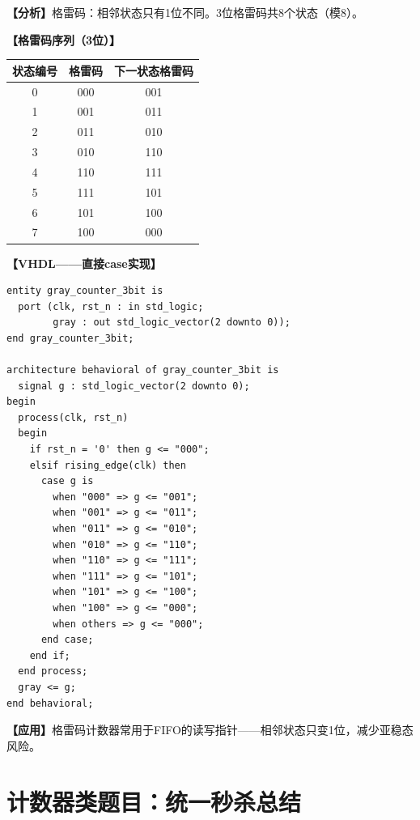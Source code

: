 \begin{solution}[完整解答]

\textbf{【分析】}格雷码：相邻状态只有1位不同。3位格雷码共8个状态（模8）。

\textbf{【格雷码序列（3位）】}
\begin{center}
\begin{tabular}{|c|c|c|}
\hline 状态编号 & 格雷码 & 下一状态格雷码 \\ \hline
0 & 000 & 001 \\ \hline 1 & 001 & 011 \\ \hline
2 & 011 & 010 \\ \hline 3 & 010 & 110 \\ \hline
4 & 110 & 111 \\ \hline 5 & 111 & 101 \\ \hline
6 & 101 & 100 \\ \hline 7 & 100 & 000 \\ \hline
\end{tabular}
\end{center}

\textbf{【VHDL——直接case实现】}
\begin{lstlisting}
entity gray_counter_3bit is
  port (clk, rst_n : in std_logic;
        gray : out std_logic_vector(2 downto 0));
end gray_counter_3bit;

architecture behavioral of gray_counter_3bit is
  signal g : std_logic_vector(2 downto 0);
begin
  process(clk, rst_n)
  begin
    if rst_n = '0' then g <= "000";
    elsif rising_edge(clk) then
      case g is
        when "000" => g <= "001";
        when "001" => g <= "011";
        when "011" => g <= "010";
        when "010" => g <= "110";
        when "110" => g <= "111";
        when "111" => g <= "101";
        when "101" => g <= "100";
        when "100" => g <= "000";
        when others => g <= "000";
      end case;
    end if;
  end process;
  gray <= g;
end behavioral;
\end{lstlisting}

\textbf{【应用】}格雷码计数器常用于FIFO的读写指针——相邻状态只变1位，减少亚稳态风险。

\end{solution}


\section{计数器类题目：统一秒杀总结}

